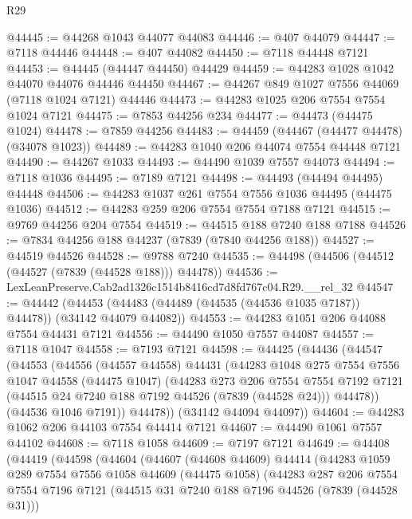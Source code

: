 \begin{lexlean}{R29}
\begin{coremodule}
@44445 := @44268 @1043 @44077 @44083
@44446 := @407 @44079
@44447 := @7118 @44446
@44448 := @407 @44082
@44450 := @7118 @44448 @7121
@44453 := @44445 (@44447 @44450) @44429
@44459 := @44283 @1028 @1042 @44070 @44076 @44446 @44450
@44467 := @44267 @849 @1027 @7556 @44069 (@7118 @1024 @7121) @44446
@44473 := @44283 @1025 @206 @7554 @7554 @1024 @7121
@44475 := @7853 @44256 @234
@44477 := @44473 (@44475 @1024)
@44478 := @7859 @44256
@44483 := @44459 (@44467 (@44477 @44478) (@34078 @1023))
@44489 := @44283 @1040 @206 @44074 @7554 @44448 @7121
@44490 := @44267 @1033
@44493 := @44490 @1039 @7557 @44073
@44494 := @7118 @1036
@44495 := @7189 @7121
@44498 := @44493 (@44494 @44495) @44448
@44506 := @44283 @1037 @261 @7554 @7556 @1036 @44495 (@44475 @1036)
@44512 := @44283 @259 @206 @7554 @7554 @7188 @7121
@44515 := @9769 @44256 @204 @7554
@44519 := @44515 @188 @7240 @188 @7188
@44526 := @7834 @44256 @188 @44237 (@7839 (@7840 @44256 @188))
@44527 := @44519 @44526
@44528 := @9788 @7240
@44535 := @44498 (@44506 (@44512 (@44527 (@7839 (@44528 @188))) @44478))
@44536 := LexLeanPreserve.Cab2ad1326c1514b8416cd7d8fd767c04.R29.__rel_32
@44547 := @44442
    (@44453 (@44483 (@44489 (@44535 (@44536 @1035 @7187)) @44478)) (@34142 @44079 @44082))
@44553 := @44283 @1051 @206 @44088 @7554 @44431 @7121
@44556 := @44490 @1050 @7557 @44087
@44557 := @7118 @1047
@44558 := @7193 @7121
@44598 := @44425
    (@44436
      (@44547
        (@44553
          (@44556
            (@44557 @44558)
            @44431
            (@44283
              @1048
              @275
              @7554
              @7556
              @1047
              @44558
              (@44475 @1047)
              (@44283
                @273
                @206
                @7554
                @7554
                @7192
                @7121
                (@44515 @24 @7240 @188 @7192 @44526 (@7839 (@44528 @24)))
                @44478))
            (@44536 @1046 @7191))
          @44478))
      (@34142 @44094 @44097))
@44604 := @44283 @1062 @206 @44103 @7554 @44414 @7121
@44607 := @44490 @1061 @7557 @44102
@44608 := @7118 @1058
@44609 := @7197 @7121
@44649 := @44408
    (@44419
      (@44598
        (@44604
          (@44607
            (@44608 @44609)
            @44414
            (@44283
              @1059
              @289
              @7554
              @7556
              @1058
              @44609
              (@44475 @1058)
              (@44283
                @287
                @206
                @7554
                @7554
                @7196
                @7121
                (@44515 @31 @7240 @188 @7196 @44526 (@7839 (@44528 @31)))

\end{coremodule}
\end{lexlean}
